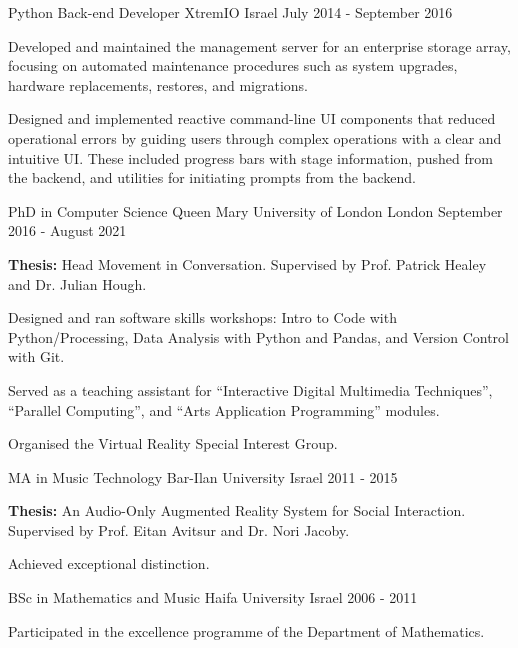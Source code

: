 \documentclass[11pt, a4paper]{awesome-cv}
\begin{document}
\begin{cventries}
  \cventry
    {Python Back-end Developer}
    {XtremIO}
    {Israel}
    {July 2014 - September 2016}
    {
      \begin{cvitems}
        \item {Developed and maintained the management server for an enterprise storage array, focusing on automated maintenance procedures such as system upgrades, hardware replacements, restores, and migrations.}
        \item {Designed and implemented reactive command-line UI components that reduced operational errors by guiding users through complex operations with a clear and intuitive UI. These included progress bars with stage information, pushed from the backend, and utilities for initiating prompts from the backend.}
      \end{cvitems}
    }

\end{cventries}



\begin{cventries}

  \cventry
    {PhD in Computer Science}
    {Queen Mary University of London}
    {London}
    {September 2016 - August 2021}
    {
      \begin{cvitems}
        \item {\textbf{Thesis:} Head Movement in Conversation. Supervised by Prof. Patrick Healey and Dr. Julian Hough.}
        \item {Designed and ran software skills workshops: Intro to Code with Python/Processing, Data Analysis with Python and Pandas, and Version Control with Git.}
        \item {Served as a teaching assistant for ``Interactive Digital Multimedia Techniques'', ``Parallel Computing'', and ``Arts Application Programming'' modules.}
        \item {Organised the Virtual Reality Special Interest Group.}
      \end{cvitems}
    }

  \cventry
    {MA in Music Technology}
    {Bar-Ilan University}
    {Israel}
    {2011 - 2015}
    {
      \begin{cvitems}
        \item {\textbf{Thesis:} An Audio-Only Augmented Reality System for Social Interaction. Supervised by Prof. Eitan Avitsur and Dr. Nori Jacoby.}
        \item {Achieved exceptional distinction.}
      \end{cvitems}
    }

  \cventry
    {BSc in Mathematics and Music}
    {Haifa University}
    {Israel}
    {2006 - 2011}
    {
      \begin{cvitems}
        \item {Participated in the excellence programme of the Department of Mathematics.}
      \end{cvitems}
    }

\end{cventries}

\end{document}

